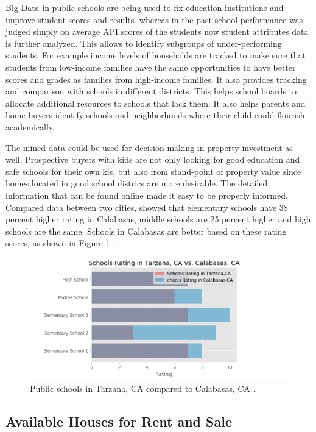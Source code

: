 \documentclass[sigconf]{acmart}
\begin{document}
Big Data in public schools are being used to fix education institutions and improve student scores and results. whereas in the past school performance was judged simply on average API scores of the students now student attributes data is further analyzed.  This allows to identify subgroups of under-performing students.  For example income levels of households are tracked to make sure that students from low-income families have the same opportunities to have better scores and grades as families from high-income families. It also provides tracking and comparison with schools in different districts. This helps school boards to allocate additional resources to schools that lack them.  It also helps parents and home buyers identify schools and neighborhoods where their child could flourish academically.   

The mined data could be used for decision making in property investment as well. Prospective buyers with kids are not only looking for good education and safe schools for their own kis, but also from stand-point of property value since homes located in good school districs are more desirable. The detailed information that can be found online made it easy to be properly informed. 
Compared data between two cities, showed that elementary schools have 38 percent higher rating in Calabasas, middle schools are 25 percent higher and high schools are the same. 
Schools in Calabasas are better based on these rating scores, as shown in Figure \ref{fig:figure10} \cite{md}.

\begin{figure}
  \centering
  \includegraphics[width=1.0\columnwidth]{images/figure10.png}
  \caption{Public schools in Tarzana, CA compared to Calabasas, CA \cite{md}.} \label{fig:figure10} 
\end{figure}

\subsection{Available Houses for Rent and Sale}
\end{document}
